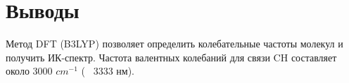 \section{Выводы}
Метод DFT (B3LYP) позволяет определить колебательные частоты молекул и получить ИК-спектр. Частота валентных колебаний для связи CH составляет около 3000 $cm^{-1}$ (~ 3333 нм). 